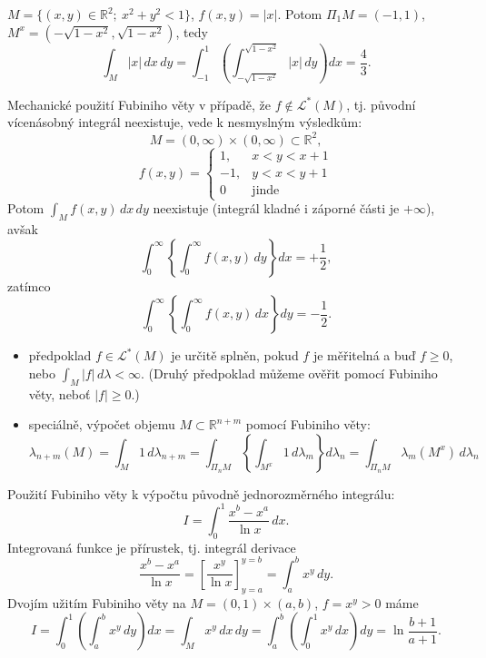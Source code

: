\begin{priklad}
$M = \{(x, y) \in \mathbb{R}^2; \ x^2 + y^2 < 1\}$, $f(x, y) = |x|$.
Potom $\Pi_1 M = (-1, 1)$,
$M^x = (-\sqrt{1-x^2}, \sqrt{1-x^2})$, tedy
\[
\int_M |x| \, dx\, dy
= \int_{-1}^1 \left( \int_{-\sqrt{1-x^2}}^{\sqrt{1-x^2}} |x| \, dy
\right) dx = \frac{4}{3}.
\]
\end{priklad}

\begin{poznamka}
Mechanické použití Fubiniho věty v případě, že
$f \notin \mathcal{L}^*(M)$, tj. původní vícenásobný integrál
neexistuje, vede k nesmyslným výsledkům:
\[
M = (0, \infty) \times (0, \infty) \subset \mathbb{R}^2,
\]
\[
f(x, y) = \begin{cases}
1, & x < y < x+1 \\
-1, & y < x < y+1 \\
0 & \text{jinde}
\end{cases}
\]
Potom $\int_M f(x, y) \, dx\, dy$ neexistuje (integrál kladné i záporné
části je $+\infty$), avšak
\[
\int_0^\infty \left\{ \int_0^\infty f(x, y) \, dy \right\} dx
= +\frac{1}{2},
\]
zatímco
\[
\int_0^\infty \left\{ \int_0^\infty f(x, y) \, dx \right\} dy
= -\frac{1}{2}.
\]

\begin{itemize}
\item předpoklad $f \in \mathcal{L}^*(M)$ je určitě splněn, pokud $f$
je měřitelná a buď $f \ge 0$, nebo
$\int_M |f| \, d\lambda < \infty$. (Druhý předpoklad můžeme ověřit
pomocí Fubiniho věty, neboť $|f| \ge 0$.)
\item speciálně, výpočet objemu $M \subset \mathbb{R}^{n+m}$ pomocí
Fubiniho věty:
\[
\lambda_{n+m}(M) = \int_M 1 \, d\lambda_{n+m}
= \int_{\Pi_n M} \left\{ \int_{M^x} 1 \, d\lambda_m \right\}
d\lambda_n
= \int_{\Pi_n M} \lambda_m(M^x) \, d\lambda_n
\]
\end{itemize}
\end{poznamka}

\begin{priklad}
Použití Fubiniho věty k výpočtu původně jednorozměrného integrálu:
\[
I = \int_0^1 \frac{x^b - x^a}{\ln x} \, dx.
\]
Integrovaná funkce je přírustek, tj. integrál derivace
\[
\frac{x^b - x^a}{\ln x}
= \left[ \frac{x^y}{\ln x} \right]_{y=a}^{y=b}
= \int_a^b x^y \, dy.
\]
Dvojím užitím Fubiniho věty na $M = (0, 1) \times (a, b)$,
$f = x^y > 0$ máme
\[
I = \int_0^1 \left( \int_a^b x^y \, dy \right) dx
= \int_M x^y \, dx\, dy
= \int_a^b \left( \int_0^1 x^y \, dx \right) dy
= \ln \frac{b+1}{a+1}.
\]
\end{priklad}


